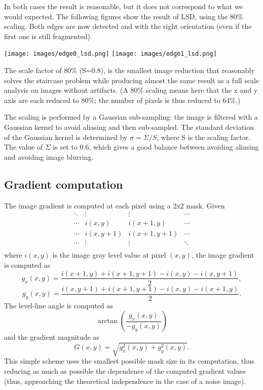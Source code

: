\documentclass{ipol}
\begin{document}
In both cases the result is reasonable, but it does not correspond to
what we would expected. The following figures show the result of LSD,
using the 80\% scaling. Both edges are now detected and with the right
orientation (even if the first one is still fragmented).

\begin{center}
\texttt{[image: images/edge0\_lsd.png]}
\texttt{[image: images/edge1\_lsd.png]}
\end{center}

The scale factor of 80\% (S=0.8), is the smallest image reduction that
reasonably solves the staircase problem while producing almost the
same result as a full scale analysis on images without artifacts. (A
80\% scaling means here that the x and y axis are each reduced to
80\%; the number of pixels is thus reduced to 64\%.)

The scaling is performed by a Gaussian sub-sampling: the image is
filtered with a Gaussian kernel to avoid aliasing and then
sub-sampled. The standard deviation of the Gaussian kernel is
determined by $\sigma=\Sigma/S$, where S is the scaling factor. The
value of $\Sigma$ is set to 0.6, which gives a good balance between
avoiding aliasing and avoiding image blurring.


\subsection{Gradient computation}

The image gradient is computed at each pixel using a 2x2 mask. Given
$$
   \begin{array}{c|c|c|c}
                  \ddots & \vdots   & \vdots     & \cdots \\
                  \hline
                  \cdots & i(x,y)   & i(x+1,y)   & \cdots \\
                  \hline
                  \cdots & i(x,y+1) & i(x+1,y+1) & \cdots \\
                  \hline
                  \cdots & \vdots   & \vdots     & \ddots \\
                \end{array}
$$
where $i(x,y)$ is the image gray level value at pixel
$(x,y)$, the image gradient is computed as
$$
   g_x(x,y)=\frac{i(x+1,y)+i(x+1,y+1)-i(x,y)-i(x,y+1)}{2},
$$
$$
   g_y(x,y)=\frac{i(x,y+1)+i(x+1,y+1)-i(x,y)-i(x+1,y)}{2}.
$$
The level-line angle is computed as
$$
   \arctan{\left(\frac{g_x(x,y)}{-g_y(x,y)}\right)}
$$
and the gradient magnitude as
$$
   G(x,y)=\sqrt{ g_x^2(x,y) + g_y^2(x,y) }.
$$
This simple scheme uses the smallest possible mask size in its
computation, thus reducing as much as possible the dependence of the
computed gradient values (thus, approaching the theoretical
independence in the case of a noise image).
\end{document}
